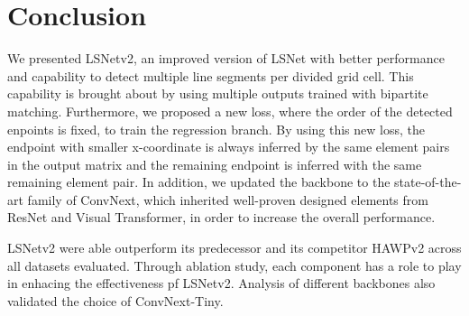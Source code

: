 \documentclass[journal]{IEEEtran}
\begin{document}






 















\section{Conclusion}
We presented LSNetv2, an improved version of LSNet with better performance and capability to detect multiple line segments per divided grid cell. This capability is brought about by using multiple outputs trained with bipartite matching. Furthermore, we proposed a new loss, where the order of the detected enpoints is fixed, to train the regression branch. By using this new loss, the endpoint with smaller x-coordinate is always inferred by the same element pairs in the output matrix and the remaining endpoint is inferred with the same remaining element pair. In addition, we updated the backbone to the state-of-the-art family of ConvNext, which inherited well-proven designed elements from ResNet and Visual Transformer, in order to increase the overall performance.

LSNetv2 were able outperform its predecessor and its competitor HAWPv2 across all datasets evaluated. Through ablation study, each component has a role to play in enhacing the effectiveness pf LSNetv2. Analysis of different backbones also validated the choice of ConvNext-Tiny.







\end{document}
